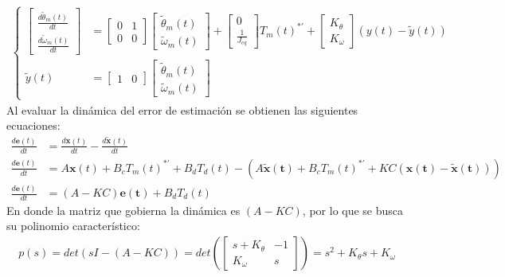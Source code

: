 \documentclass[a4paper, 10pt, onecolumn,journal]{ieeeconf}
\begin{document}
\begin{align}
	\begin{cases}
		\begin{bmatrix}
			\frac{d \tilde{\theta}_m(t)}{dt} \\ 
			\frac{d \tilde{\omega}_m(t)}{dt}
		\end{bmatrix} &= 
		\begin{bmatrix}
			0 & 1 \\ 
			0 & 0
		\end{bmatrix}
		\begin{bmatrix}
			{\tilde{\theta}}_m(t) \\ 
			{\tilde{\omega}}_m(t)
		\end{bmatrix} + 
		\begin{bmatrix}
			0 \\ 
			\frac{1}{J_{eq}}
		\end{bmatrix} {T_m(t)}^{*'} + 
		\begin{bmatrix}
			K_{\theta} \\
			K_{\omega}
		\end{bmatrix} \left(y(t) - \tilde{y}(t) \right) \\
		\tilde{y}(t) &= \begin{bmatrix}
			1 & 0
		\end{bmatrix} 
		\begin{bmatrix}
			{\tilde{\theta}}_m(t) \\ 
			{\tilde{\omega}}_m(t)
		\end{bmatrix}
	\end{cases}\label{ecuacion matricial de observador}
\end{align}
Al evaluar la dinámica del error de estimación se obtienen las siguientes ecuaciones: 
\begin{align}
	\frac{d \mathbf{e}(t)}{dt} &= \frac{d \mathbf{x}(t)}{dt} - \frac{d \mathbf{\tilde{x}} (t)}{dt}\\
	\frac{d \mathbf{e}(t)}{dt} &= A {\mathbf{x}(t)} + B_c {T_m(t)}^{*'} + B_d T_d(t) - \left( A \mathbf{\tilde{x} (t)} + B_c {T_m(t)}^{*'} + K C \left(\mathbf{x(t)} - \mathbf{\tilde{x} (t)} \right) \right) \\
	\frac{d \mathbf{e}(t)}{dt} &= \left(A - KC \right) {\mathbf{e(t)}} + B_d T_d(t)\label{dinamica del error de estimacion}
\end{align}
En donde la matriz que gobierna la dinámica es $\left(A - KC \right)$, por lo que se busca su polinomio característico:
\begin{align}
	p(s) = det\left(s I - \left( A - KC\right)  \right) = det\left(\begin{bmatrix}
		s + K_{\theta} & -1 \\ 
		K_{\omega} & s
	\end{bmatrix}  
	 \right) = s^2 + K_{\theta} s + K_{\omega} \label{polinomeo caracteristico de observador}
\end{align}
\end{document}
